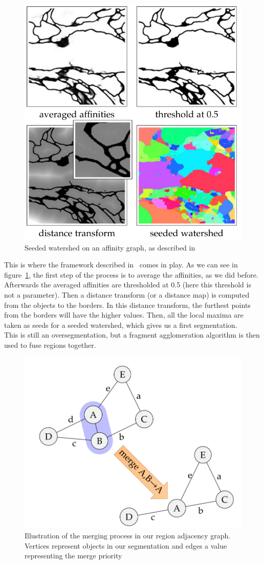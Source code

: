 \begin{figure}[!htbp]
	\centering
	\includegraphics[width=0.5\linewidth]{./images/mala_post_proc.png}
	\caption{Seeded watershed on an affinity graph, as described in~\cite{funke_large_2019}}%
	\label{fig:seeded_ws}
\end{figure}

This is where the framework described in~\cite{funke_large_2019} comes in play.
As we can see in figure~\ref{fig:seeded_ws}, the first step of the process is
to average the affinities, as we did before. Afterwards the averaged affinities
are thresholded at 0.5 (here this threshold is not a parameter). Then a
distance transform (or a distance map) is computed from the objects to the
borders. In this distance transform, the furthest points from the borders will
have the higher values. Then, all the local maxima are taken as seeds for a
seeded watershed, which gives us a first segmentation.\\

This is still an oversegmentation, but a fragment agglomeration algorithm is
then used to fuse regions together. 

\begin{figure}[!htbp]
	\centering
	\includegraphics[width=0.5\linewidth]{./images/rag.png}
	\caption{Illustration of the merging process in our region adjacency graph.
	Vertices represent objects in our segmentation and edges a value
representing the merge priority}%
	\label{fig:rag}
\end{figure}

